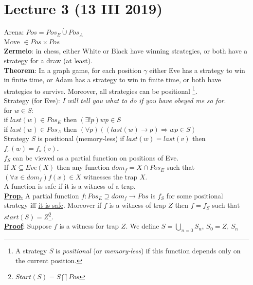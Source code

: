 \section{Lecture 3 (13 III 2019)}

Arena: $Pos = Pos_E \dot\cup  Pos_A$\\
Move $\in Pos \times Pos$\\

\noindent
\textbf{Zermelo}: in chess, either White or Black have winning strategies, or
both have a strategy for a draw (at least).\\
\textbf{Theorem}: In a graph game, for each position $\gamma$ either Eve has a
strategy to win in finite time, or Adam has a strategy to win in finite time,
or both have strategies to survive. Moreover, all strategies can be positional
\footnote{
	A strategy $S$ is \textit{positional} (or \textit{memory-less}) if this
	function depends only on the current position.
}.\\
Strategy (for Eve): \textit{I will tell you what to do if you have obeyed me so
far.}\\
for $w \in S$:\\
if $last(w) \in Pos_E$ then $(\exists !p) wp \in S$\\
if $last(w) \in Pos_A$ then $(\forall p) ((last(w) \rightarrow p) \Rightarrow wp \in S)$\\

\noindent
Strategy $S$ is positional (memory-less) if $last(w) = last(v)$ then $f_s(w) = f_s(v)$.\\

\noindent
$f_S$ can be viewed as a partial function on positions of Eve.\\

\noindent
If $X \subseteq Eve(X)$ then any function $dom_f = X \cap Pos_E$ such that $(\forall x \in dom_f) f(x) \in X$
witnesses the trap $X$.\\
A function is safe if it is a witness of a trap.\\
\underline{\textbf{Prop.}} A partial function $f : Pos_E \supseteq dom_f \rightarrow Pos$
is $f_S$ for some positional strategy iff \underline{it is safe}. Moreover if $f$ is a witness of trap $Z$ then
$f = f_S$ such that $start(S) = Z$\footnote{
$Start(S) = S \bigcap Pos$
}.\\

\noindent
\underline{\textbf{Proof}}: Suppose $f$ is a witness for trap $Z$. We define $S = \bigcup_{n = 0} S_n$,
$S_0 = Z$, $S_n$\\

